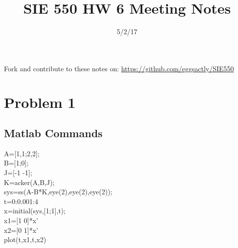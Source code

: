 \documentclass[12pt]{article}
\begin{document}
\title{SIE 550 HW 6 Meeting Notes}
\date{5/2/17}

\maketitle

Fork and contribute to these notes on: \url{https://github.com/eggsactly/SIE550}

\section*{Problem 1}
\subsection*{Matlab Commands}
A=[1,1;2,2];\\
B=[1;0];\\
J=[-1 -1];\\
K=acker(A,B,J);\\
sys=ss(A-B*K,eye(2),eye(2),eye(2));\\
t=0:0.001:4\\
x=initial(sys,[1;1],t);\\
x1=[1 0]*x'\\
x2=[0 1]*x'\\
plot(t,x1,t,x2)\\
\end{document}
